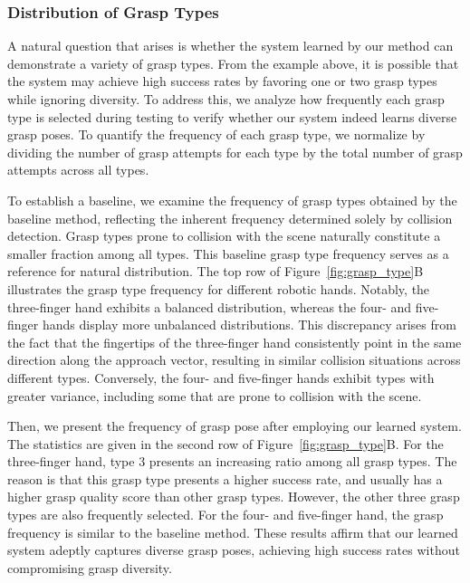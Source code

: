 \subsubsection*{Distribution of Grasp Types}
A natural question that arises is whether the system learned by our method can demonstrate a variety of grasp types. From the example above, it is possible that the system may achieve high success rates by favoring one or two grasp types while ignoring diversity. To address this, we analyze how frequently each grasp type is selected during testing to verify whether our system indeed learns diverse grasp poses. To quantify the frequency of each grasp type, we normalize by dividing the number of grasp attempts for each type by the total number of grasp attempts across all types.

To establish a baseline, we examine the frequency of grasp types obtained by the baseline method, reflecting the inherent frequency determined solely by collision detection. Grasp types prone to collision with the scene naturally constitute a smaller fraction among all types. This baseline grasp type frequency serves as a reference for natural distribution. The top row of Figure~\ref{fig:grasp_type}B illustrates the grasp type frequency for different robotic hands. Notably, the three-finger hand exhibits a balanced distribution, whereas the four- and five-finger hands display more unbalanced distributions. This discrepancy arises from the fact that the fingertips of the three-finger hand consistently point in the same direction along the approach vector, resulting in similar collision situations across different types. Conversely, the four- and five-finger hands exhibit types with greater variance, including some that are prone to collision with the scene.

Then, we present the frequency of grasp pose after employing our learned system. The statistics are given in the second row of Figure~\ref{fig:grasp_type}B. For the three-finger hand, type 3 presents an increasing ratio among all grasp types. The reason is that this grasp type presents a higher success rate, and usually has a higher grasp quality score than other grasp types. However, the other three grasp types are also frequently selected. For the four- and five-finger hand, the grasp frequency is similar to the baseline method. These results affirm that our learned system adeptly captures diverse grasp poses, achieving high success rates without compromising grasp diversity.

